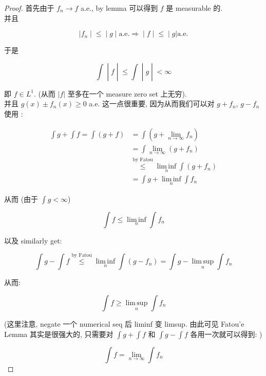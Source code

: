 \begin{proof}

首先由于 \(f_{n}\rightarrow f\) a.e., by lemma 可以得到 \(f\) 是 measurable 的.\\
并且

\[\left. |f_{n} \middle| \leq \middle| g \middle| \text{a.e.}\Longrightarrow \middle| f \middle| \leq \middle| g \right|\text{a.e.}\]

于是

\[\left. \int \middle| f \middle| \leq \int \middle| g \middle| < \infty \right.\]

即 \(f \in L^{1}\). (从而 \(|f|\) 至多在一个 measure zero set 上无穷).\\
并且 \(g(x) \pm f_{n}(x) \geq 0\) a.e. 这一点很重要, 因为从而我们可以对 \(g + f_{n}\), \(g - f_{n}\) 使用 :

\[\begin{matrix}
{\int g + \int f = \int(g + f)} & {= \int(g + \lim\limits_{n\rightarrow\infty}f_{n})} \\
 & {= \int\lim\limits_{n\rightarrow\infty}(g + f_{n})} \\
 & {\overset{\text{by Fatou}}{\leq}\operatorname{lim\, inf}\limits_{n}\int(g + f_{n})} \\
 & {= \int g + \operatorname{lim\, inf}\limits_{n}\int f_{n}}
\end{matrix}\]

从而 (由于 \(\int g < \infty\))

\[\int f \leq \operatorname{lim\, inf}\limits_{n}\int f_{n}\]

以及 similarly get:

\[\int g - \int f\overset{\text{by Fatou}}{\leq}\operatorname{lim\, inf}\limits_{n}\int(g - f_{n}) = \int g - \operatorname{lim\, sup}\limits_{n}\int f_{n}\]

从而:

\[\int f \geq \operatorname{lim\, sup}\limits_{n}\int f_{n}\]

(这里注意, negate 一个 numerical seq 后 liminf 变 limsup. 由此可见 Fatou'e Lemma 其实是很强大的, 只需要对 \(\int g + \int f\) 和 \(\int g - \int f\) 各用一次就可以得到: )

\[\int f = \lim\limits_{n\rightarrow\infty}\int f_{n}\]

\end{proof}

